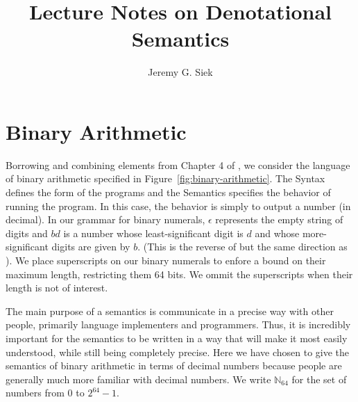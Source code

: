 \documentclass{tufte-handout}
\title{Lecture Notes on Denotational Semantics}
\author{Jeremy G. Siek}
\newcommand{\FNAT}[0]{\mathbb{N}_{64}}
\begin{document}
\maketitle

\tableofcontents

\clearpage


\section{Binary Arithmetic}
\label{sec:binary-arithmetic}


Borrowing and combining elements from Chapter 4 of
\citet{Schmidt:1986vn}, we consider the language of binary arithmetic
specified in Figure~\ref{fig:binary-arithmetic}.  The Syntax defines
the form of the programs and the Semantics specifies the behavior of
running the program. In this case, the behavior is simply to output a
number (in decimal). In our grammar for binary numerals, $\epsilon$
represents the empty string of digits and $bd$ is a number whose
least-significant digit is $d$ and whose more-significant digits are
given by $b$. (This is the reverse of \citet{Schmidt:1986vn} but the
same direction as \citet{Stoy:1977aa}). We place superscripts on our
binary numerals to enfore a bound on their maximum length, restricting
them 64 bits. We ommit the superscripts when their length is not of
interest.

The main purpose of a semantics is communicate in a precise way with
other people, primarily language implementers and programmers.  Thus,
it is incredibly important for the semantics to be written in a way
that will make it most easily understood, while still being completely
precise.  Here we have chosen to give the semantics of binary
arithmetic in terms of decimal numbers because people are generally
much more familiar with decimal numbers. We write $\FNAT$ for the set
of numbers from $0$ to $2^{64}-1$.
\end{document}
